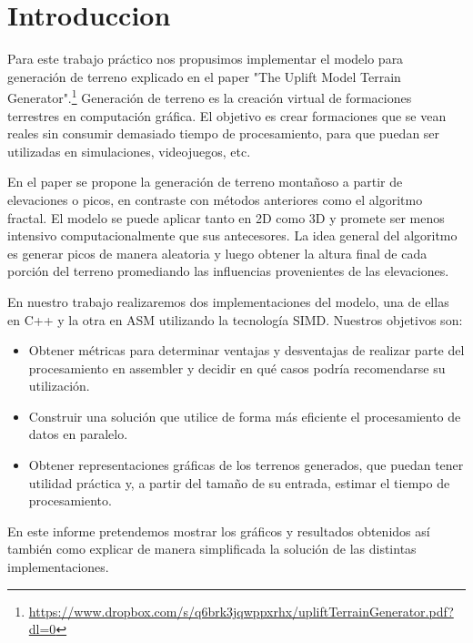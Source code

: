 \section{Introduccion}

Para este trabajo práctico nos propusimos implementar el modelo para generación de terreno explicado en el paper "The Uplift Model Terrain Generator".\footnote{\url{https://www.dropbox.com/s/q6brk3jqwppxrhx/upliftTerrainGenerator.pdf?dl=0}} Generación de terreno es la creación virtual de formaciones terrestres en computación gráfica. El objetivo es crear formaciones que se vean reales sin consumir demasiado tiempo de procesamiento, para que puedan ser utilizadas en simulaciones, videojuegos, etc.

En el paper se propone la generación de terreno montañoso a partir de elevaciones o picos, en contraste con métodos anteriores como el algoritmo fractal. El modelo se puede aplicar tanto en 2D como 3D y promete ser menos intensivo computacionalmente que sus antecesores. La idea general del algoritmo es generar picos de manera aleatoria y luego obtener la altura final de cada porción del terreno promediando las influencias provenientes de las elevaciones.

En nuestro trabajo realizaremos dos implementaciones del modelo, una de ellas en C++ y la otra en ASM utilizando la tecnología SIMD.
Nuestros objetivos son:

\begin{itemize}
\item Obtener métricas para determinar ventajas y desventajas de realizar parte del procesamiento en assembler y decidir en qué casos podría recomendarse su utilización.
\item Construir una solución que utilice de forma más eficiente el procesamiento de datos en paralelo.
\item Obtener representaciones gráficas de los terrenos generados, que puedan tener utilidad práctica y, a partir del tamaño de su entrada, estimar el tiempo de procesamiento.
\end{itemize}

En este informe pretendemos mostrar los gráficos y resultados obtenidos así también como explicar de manera simplificada la solución de las distintas implementaciones.